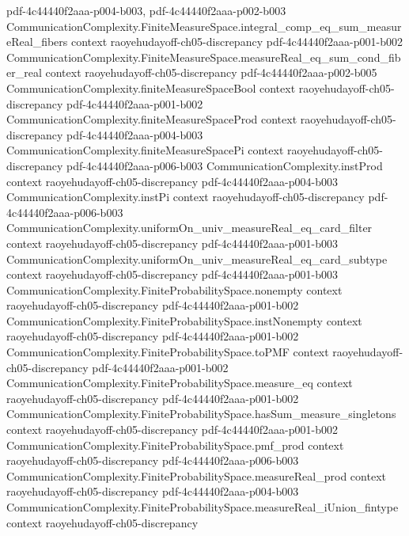 \begin{lemma}
  {pdf-4c44440f2aaa-p004-b003,
    pdf-4c44440f2aaa-p002-b003}
\proofstep
  {CommunicationComplexity.FiniteMeasureSpace.integral_comp_eq_sum_measureReal_fibers}
  {context}
  {raoyehudayoff-ch05-discrepancy}
  {pdf-4c44440f2aaa-p001-b002}
\proofstep
  {CommunicationComplexity.FiniteMeasureSpace.measureReal_eq_sum_cond_fiber_real}
  {context}
  {raoyehudayoff-ch05-discrepancy}
  {pdf-4c44440f2aaa-p002-b005}
\proofstep
  {CommunicationComplexity.finiteMeasureSpaceBool}
  {context}
  {raoyehudayoff-ch05-discrepancy}
  {pdf-4c44440f2aaa-p001-b002}
\proofstep
  {CommunicationComplexity.finiteMeasureSpaceProd}
  {context}
  {raoyehudayoff-ch05-discrepancy}
  {pdf-4c44440f2aaa-p004-b003}
\proofstep
  {CommunicationComplexity.finiteMeasureSpacePi}
  {context}
  {raoyehudayoff-ch05-discrepancy}
  {pdf-4c44440f2aaa-p006-b003}
\proofstep
  {CommunicationComplexity.instProd}
  {context}
  {raoyehudayoff-ch05-discrepancy}
  {pdf-4c44440f2aaa-p004-b003}
\proofstep
  {CommunicationComplexity.instPi}
  {context}
  {raoyehudayoff-ch05-discrepancy}
  {pdf-4c44440f2aaa-p006-b003}
\proofstep
  {CommunicationComplexity.uniformOn_univ_measureReal_eq_card_filter}
  {context}
  {raoyehudayoff-ch05-discrepancy}
  {pdf-4c44440f2aaa-p001-b003}
\proofstep
  {CommunicationComplexity.uniformOn_univ_measureReal_eq_card_subtype}
  {context}
  {raoyehudayoff-ch05-discrepancy}
  {pdf-4c44440f2aaa-p001-b003}
\proofstep
  {CommunicationComplexity.FiniteProbabilitySpace.nonempty}
  {context}
  {raoyehudayoff-ch05-discrepancy}
  {pdf-4c44440f2aaa-p001-b002}
\proofstep
  {CommunicationComplexity.FiniteProbabilitySpace.instNonempty}
  {context}
  {raoyehudayoff-ch05-discrepancy}
  {pdf-4c44440f2aaa-p001-b002}
\proofstep
  {CommunicationComplexity.FiniteProbabilitySpace.toPMF}
  {context}
  {raoyehudayoff-ch05-discrepancy}
  {pdf-4c44440f2aaa-p001-b002}
\proofstep
  {CommunicationComplexity.FiniteProbabilitySpace.measure_eq}
  {context}
  {raoyehudayoff-ch05-discrepancy}
  {pdf-4c44440f2aaa-p001-b002}
\proofstep
  {CommunicationComplexity.FiniteProbabilitySpace.hasSum_measure_singletons}
  {context}
  {raoyehudayoff-ch05-discrepancy}
  {pdf-4c44440f2aaa-p001-b002}
\proofstep
  {CommunicationComplexity.FiniteProbabilitySpace.pmf_prod}
  {context}
  {raoyehudayoff-ch05-discrepancy}
  {pdf-4c44440f2aaa-p006-b003}
\proofstep
  {CommunicationComplexity.FiniteProbabilitySpace.measureReal_prod}
  {context}
  {raoyehudayoff-ch05-discrepancy}
  {pdf-4c44440f2aaa-p004-b003}
\proofstep
  {CommunicationComplexity.FiniteProbabilitySpace.measureReal_iUnion_fintype}
  {context}
  {raoyehudayoff-ch05-discrepancy}

\end{lemma}
